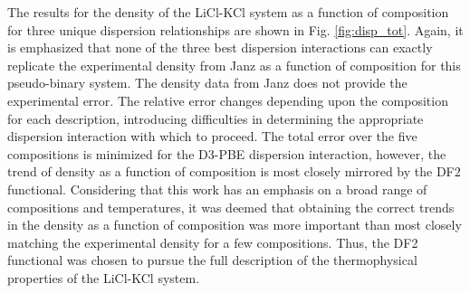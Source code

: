 \documentclass[review]{elsarticle}
\begin{document}

The results for the density of the LiCl-KCl system as a function of composition for three unique dispersion relationships are shown in Fig. \ref{fig:disp_tot}. Again, it is emphasized that none of the three best dispersion interactions can exactly replicate the experimental density from Janz as a function of composition for this pseudo-binary system. The density data from Janz does not provide the experimental error. The relative error changes depending upon the composition for each description, introducing difficulties in determining the appropriate dispersion interaction with which to proceed. The total error over the five compositions is minimized for the D3-PBE dispersion interaction, however, the trend of density as a function of composition is most closely mirrored by the DF2 functional. Considering that this work has an emphasis on a broad range of compositions and temperatures, it was deemed that obtaining the correct trends in the density as a function of composition was more important than most closely matching the experimental density for a few compositions. Thus, the DF2 functional was chosen to pursue the full description of the thermophysical properties of the LiCl-KCl system. 
\end{document}
